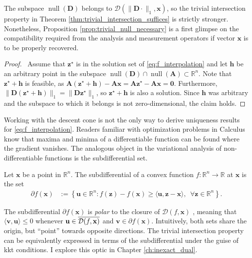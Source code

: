 The subspace $\operatorname{null} \left ( \mathbf{D} \right )$ belongs to $\mathcal{D}(\|\mathbf{D} \cdot \|_1, \mathbf{x})$, so the trivial intersection property in Theorem \ref{thm:trivial_intersection_suffices} is strictly stronger. Nonetheless, Proposition \ref{prop:trivial_null_necessary} is a first glimpse on the compatibility required from the analysis and measurement operators if vector $\mathbf{x}$ is to be properly recovered.

\begin{proof}
    \pf\ Assume that $\mathbf{z}^\star$ is in the solution set of \eqref{eq:f_interpolation} and let $\mathbf{h}$ be an arbitrary point in the subspace $\operatorname{null} \left ( \mathbf{D} \right ) \cap \operatorname{null} \left ( \mathbf{A} \right ) \subset \mathbb{R}^{n}$. Note that $\mathbf{z}^\star + \mathbf{h}$ is feasible, as $\mathbf{A}(\mathbf{z}^\star + \mathbf{h}) - \mathbf{Ax} = \mathbf{A}\mathbf{z}^\star - \mathbf{Ax} = \mathbf{0}$. Furthermore, $\|\mathbf{D(z^\star + h)}\|_1 = \|\mathbf{Dz^\star}\|_1$, so $\mathbf{z}^\star + \mathbf{h}$ is also a solution. Since $\mathbf{h}$ was arbitrary and the subspace to which it belongs is not zero-dimensional, the claim holds.\hfill\qedsymbol
\end{proof}

Working with the descent cone is not the only way to derive uniqueness results for \eqref{eq:f_interpolation}. Readers familiar with optimization problems in Calculus know that maxima and minima of a differentiable function can be found where the gradient vanishes. The analogous object in the variational analysis of non-differentiable functions is the subdifferential set.

\begin{definition}[Subdifferential]
    Let $\mathbf{x}$ be a point in $\mathbb{R}^{n}$. The subdifferential of a convex function $f: \mathbb{R}^{n} \to \mathbb{R}$ at $\mathbf{x}$ is the set
    \begin{align}
        \partial f(\mathbf{x}) & := \left \{ \mathbf{u} \in \mathbb{R}^{n} : f(\mathbf{z}) - f(\mathbf{x}) \geq \langle \mathbf{u}, \mathbf{z} - \mathbf{x}\rangle, \enspace \forall \mathbf{z} \in \mathbb{R}^{n}\right \}.
    \end{align}
\end{definition}

The subdifferential $\partial f(\mathbf{x})$ is \emph{polar} to the closure of $\mathcal{D}(f, \mathbf{x})$ \cite[Thm. 23.7]{rockafellar1970}, meaning that $\langle \mathbf{v}, \mathbf{u} \rangle \leq 0$ whenever $\mathbf{u} \in \mathop{\overline{\mathcal{D}(f, \mathbf{x})}}$ and $\mathbf{v} \in \partial f(\mathbf{x})$. Intuitively, both sets share the origin, but ``point'' towards opposite directions. The trivial intersection property can be equivalently expressed in terms of the subdifferential under the guise of \acrfull{kkt} conditions. I explore this optic in Chapter \ref{ch:inexact_dual}.

